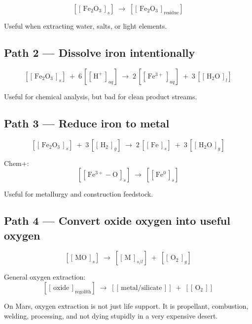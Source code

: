 \documentclass[11pt,a4paper]{article}
\newcommand{\cidb}[2]{\!\left[\!\left[\,#1\,\right]_{\!#2}\!\right]}
\newcommand{\cidn}[1]{\!\left[\!\left[\,#1\,\right]\!\right]}
\begin{document}
\[
\cidb{\mathrm{Fe_2O_3}}{s}
\;\rightarrow\;
\cidb{\mathrm{Fe_2O_3}}{\text{residue}}
\]

Useful when extracting water, salts, or light elements.

\subsection*{Path 2 --- Dissolve iron intentionally}

\[
\cidb{\mathrm{Fe_2O_3}}{s}
\;+\; 6\,\cidb{\mathrm{H^+}}{aq}
\;\rightarrow\;
2\,\cidb{\mathrm{Fe^{3+}}}{aq}
\;+\; 3\,\cidb{\mathrm{H_2O}}{l}
\]

Useful for chemical analysis, but bad for clean product streams.

\subsection*{Path 3 --- Reduce iron to metal}

\[
\cidb{\mathrm{Fe_2O_3}}{s}
\;+\; 3\,\cidb{\mathrm{H_2}}{g}
\;\rightarrow\;
2\,\cidb{\mathrm{Fe}}{s}
\;+\; 3\,\cidb{\mathrm{H_2O}}{g}
\]

Chem+:
\[
\cidb{\mathrm{Fe^{3+}{-}O}}{s}
\;\rightarrow\;
\cidb{\mathrm{Fe^0}}{s}
\]

Useful for metallurgy and construction feedstock.

\subsection*{Path 4 --- Convert oxide oxygen into useful oxygen}

\[
\cidb{\mathrm{MO}}{s}
\;\rightarrow\;
\cidb{\mathrm{M}}{s/l}
\;+\;\cidb{\mathrm{O_2}}{g}
\]

General oxygen extraction:
\[
\cidb{\text{oxide}}{\text{regolith}}
\;\rightarrow\;
\cidn{\text{metal/silicate}}
\;+\;\cidn{\mathrm{O_2}}
\]

\begin{smlaw}
On Mars, oxygen extraction is not just life support.  It is propellant,
combustion, welding, processing, and not dying stupidly in a very expensive
desert.
\end{smlaw}
\end{document}
